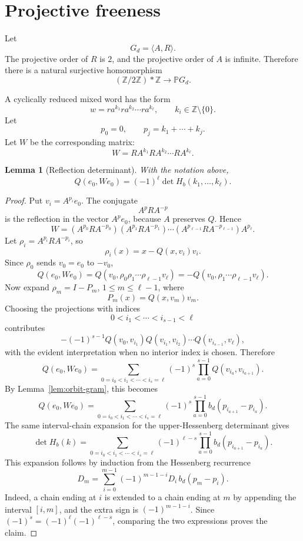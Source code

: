 \documentclass[a4paper,11pt]{amsart}
\newtheorem{lemma}[theorem]{Lemma}
\theoremstyle{remark}
\newcommand{\Z}{\mathbb Z}
\newcommand{\PP}{\mathbb P}
\numberwithin{equation}{section}
\begin{document}
\section{Projective freeness}

Let
\[
        G_d=\langle A,R\rangle.
\]
The projective order of \(R\) is \(2\), and the projective order of \(A\) is infinite.  Therefore there is a natural surjective homomorphism
\[
        (\Z/2\Z)*\Z\longrightarrow \PP G_d.
\]

A cyclically reduced mixed word has the form
\[
        w=r a^{k_1} r a^{k_2}\cdots r a^{k_\ell},
        \qquad
        k_i\in\Z\setminus\{0\}.
\]
Let
\[
        p_0=0,
        \qquad
        p_j=k_1+\cdots+k_j.
\]
Let \(W\) be the corresponding matrix:
\[
        W=R A^{k_1}R A^{k_2}\cdots R A^{k_\ell}.
\]

\begin{lemma}[Reflection determinant]\label{lem:reflection-det}
With the notation above,
\[
        Q(e_0,We_0)=(-1)^\ell\det H_b(k_1,\ldots,k_\ell).
\]
\end{lemma}

\begin{proof}
Put \(v_i=A^{p_i}e_0\).  The conjugate
\[
        A^{p}RA^{-p}
\]
is the reflection in the vector \(A^p e_0\), because \(A\) preserves \(Q\).  Hence
\[
        W=(A^{p_0}RA^{-p_0})(A^{p_1}RA^{-p_1})\cdots(A^{p_{\ell-1}}RA^{-p_{\ell-1}})A^{p_\ell}.
\]
Let \(\rho_i=A^{p_i}RA^{-p_i}\), so
\[
        \rho_i(x)=x-Q(x,v_i)v_i.
\]
Since \(\rho_0\) sends \(v_0=e_0\) to \(-v_0\),
\[
        Q(e_0,We_0)
        =Q(v_0,\rho_0\rho_1\cdots\rho_{\ell-1}v_\ell)
        =-Q(v_0,\rho_1\cdots\rho_{\ell-1}v_\ell).
\]
Now expand \(\rho_m=I-P_m\), \(1\le m\le\ell-1\), where
\[
        P_m(x)=Q(x,v_m)v_m.
\]
Choosing the projections with indices
\[
        0<i_1<\cdots<i_{s-1}<\ell
\]
contributes
\[
        -(-1)^{s-1}
        Q(v_0,v_{i_1})Q(v_{i_1},v_{i_2})\cdots Q(v_{i_{s-1}},v_\ell),
\]
with the evident interpretation when no interior index is chosen.  Therefore
\[
        Q(e_0,We_0)
        =
        \sum_{0=i_0<i_1<\cdots<i_s=\ell}
        (-1)^s
        \prod_{a=0}^{s-1}Q(v_{i_a},v_{i_{a+1}}).
\]
By Lemma~\ref{lem:orbit-gram}, this becomes
\[
        Q(e_0,We_0)
        =
        \sum_{0=i_0<i_1<\cdots<i_s=\ell}
        (-1)^s
        \prod_{a=0}^{s-1}b_d(p_{i_{a+1}}-p_{i_a}).
\]
The same interval-chain expansion for the upper-Hessenberg determinant gives
\[
        \det H_b(k)
        =
        \sum_{0=i_0<i_1<\cdots<i_s=\ell}
        (-1)^{\ell-s}
        \prod_{a=0}^{s-1}b_d(p_{i_{a+1}}-p_{i_a}).
\]
This expansion follows by induction from the Hessenberg recurrence
\[
        D_m=\sum_{i=0}^{m-1}(-1)^{m-1-i}D_i\,b_d(p_m-p_i).
\]
Indeed, a chain ending at \(i\) is extended to a chain ending at \(m\) by appending the interval \([i,m]\), and the extra sign is \((-1)^{m-1-i}\).
Since \((-1)^s=(-1)^\ell(-1)^{\ell-s}\), comparing the two expressions proves the claim.
\end{proof}
\end{document}
